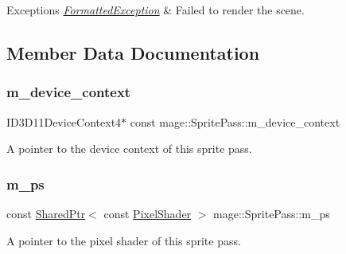 \begin{DoxyExceptions}{Exceptions}
{\em \hyperlink{classmage_1_1_formatted_exception}{Formatted\+Exception}} & Failed to render the scene. \\
\hline
\end{DoxyExceptions}


\subsection{Member Data Documentation}
\hypertarget{classmage_1_1_sprite_pass_aee6b9924a954629c19385c70ecf91d0a}{}\label{classmage_1_1_sprite_pass_aee6b9924a954629c19385c70ecf91d0a} 
\subsubsection{\texorpdfstring{m\+\_\+device\+\_\+context}{m\_device\_context}}
{\footnotesize\ttfamily I\+D3\+D11\+Device\+Context4$\ast$ const mage\+::\+Sprite\+Pass\+::m\+\_\+device\+\_\+context\hspace{0.3cm}{\ttfamily [private]}}

A pointer to the device context of this sprite pass. \hypertarget{classmage_1_1_sprite_pass_a03965c38e565dbf0cbabdb35bc836124}{}\label{classmage_1_1_sprite_pass_a03965c38e565dbf0cbabdb35bc836124} 
\subsubsection{\texorpdfstring{m\+\_\+ps}{m\_ps}}
{\footnotesize\ttfamily const \hyperlink{namespacemage_a1e01ae66713838a7a67d30e44c67703e}{Shared\+Ptr}$<$ const \hyperlink{namespacemage_a27ecaf266420ee7a494d64edc0757129}{Pixel\+Shader} $>$ mage\+::\+Sprite\+Pass\+::m\+\_\+ps\hspace{0.3cm}{\ttfamily [private]}}

A pointer to the pixel shader of this sprite pass. \hypertarget{classmage_1_1_sprite_pass_a9083152ae0681429df4dd0fce533f7dc}{}\label{classmage_1_1_sprite_pass_a9083152ae0681429df4dd0fce533f7dc} 
